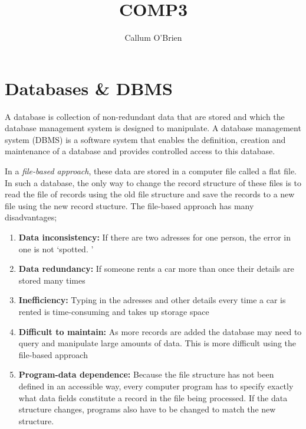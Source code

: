 \documentclass{article}
\begin{document}
\title{COMP3}
\author{Callum O'Brien}
\maketitle
\tableofcontents

\newpage

\section{Databases \& DBMS}

A database is collection of non-redundant data that are stored and which the
database management system is designed to manipulate. A database management
system (DBMS) is a software system that enables the definition, creation and
maintenance of a database and provides controlled access to this database.

In a \textit{file-based approach}, these data are stored in a computer file
called a flat file. In such a database, the only way to change the record
structure of these files is to read the file of records using the old file
structure and save the records to a new file using the new record stucture. The
file-based approach has many disadvantages;\begin{enumerate}
    
    \item \textbf{Data inconsistency:} If there are two adresses for one person,
        the error in one is not `spotted.  '

    \item \textbf{Data redundancy:} If someone rents a car more than once their
        details are stored many times

    \item \textbf{Inefficiency:} Typing in the adresses and other details every
        time a car is rented is time-consuming and takes up storage space

    \item \textbf{Difficult to maintain:} As more records are added the database
        may need to query and manipulate large amounts of data. This is more
        difficult using the file-based approach
        
    \item \textbf{Program-data dependence:} Because the file structure has not
        been defined in an accessible way, every computer program has to specify
        exactly what data fields constitute a record in the file being
        processed. If the data structure changes, programs also have to be
        changed to match the new structure.

\end{enumerate}
\end{document}
